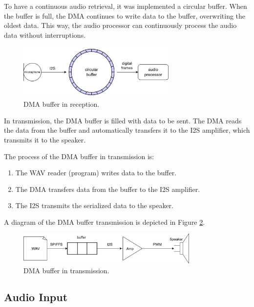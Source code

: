 To have a continuous audio retrieval, it was implemented a circular buffer. When the buffer is full, the DMA continues to write data to the buffer, overwriting the oldest data. This way, the audio processor can continuously process the audio data without interruptions.

\begin{figure}[H]
    \centering
    \includegraphics[width=0.7\textwidth]{Images/audio_input.png}
    \caption{DMA buffer in reception.}
    \label{fig:DMAReception}    
\end{figure}


In transmission, the DMA buffer is filled with data to be sent. The DMA reads the data from the buffer and automatically transfers it to the I2S amplifier, which transmits it to the speaker.

The process of the DMA buffer in transmission is:
\begin{enumerate}
    \item The WAV reader (program) writes data to the buffer.
    \item The DMA transfers data from the buffer to the I2S amplifier.
    \item The I2S transmits the serialized data to the speaker.
\end{enumerate}

A diagram of the DMA buffer transmission is depicted in Figure \ref{fig:DMATransmission}.

\begin{figure}[H]
    \centering
    \includegraphics[width=0.8\textwidth]{Images/audio_output.drawio.png}
    \caption{DMA buffer in transmission.}
    \label{fig:DMATransmission}    
\end{figure}

\subsection{Audio Input}


